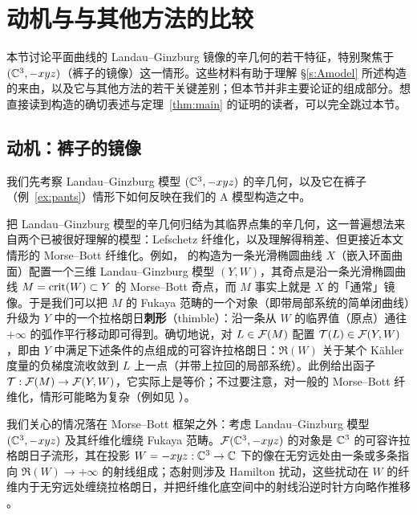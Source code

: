 \section{动机与与其他方法的比较}\label{s:pantsmotivate}

本节讨论平面曲线的 Landau--Ginzburg 镜像的辛几何的若干特征，特别聚焦于 $(\mathbb{C}^3,-xyz)$（裤子的镜像）这一情形。这些材料有助于理解 §\ref{s:Amodel} 所述构造的来由，以及它与其他方法的若干关键差别；但本节并非主要论证的组成部分。想直接读到构造的确切表述与定理~\ref{thm:main} 的证明的读者，可以完全跳过本节。

\subsection{动机：裤子的镜像}\label{ss:pantsmirror}

我们先考察 Landau--Ginzburg 模型 $(\mathbb{C}^3,-xyz)$ 的辛几何，以及它在裤子（例~\ref{ex:pants}）情形下如何反映在我们的 A 模型构造之中。

把 Landau--Ginzburg 模型的辛几何归结为其临界点集的辛几何，这一普遍想法来自两个已被很好理解的模型：Lefschetz 纤维化，以及理解得稍差、但更接近本文情形的 Morse--Bott 纤维化。例如，\cite{AAK} 的构造为一条光滑椭圆曲线 $X$（嵌入环面曲面）配置一个三维 Landau--Ginzburg 模型 $(Y,W)$，其奇点是沿一条光滑椭圆曲线 $M=\operatorname{crit}(W)\subset Y$ 的 Morse--Bott 奇点，而 $M$ 事实上就是 $X$ 的「通常」镜像。于是我们可以把 $M$ 的 Fukaya 范畴的一个对象（即带局部系统的简单闭曲线）升级为 $Y$ 中的一个拉格朗日\textbf{刺形}（thimble）：沿一条从 $W$ 的临界值（原点）通往 $+\infty$ 的弧作平行移动即可得到。确切地说，对 $L\in\mathcal{F}(M)$ 配置 $\mathcal{T}(L)\in\mathcal{F}(Y,W)$，即由 $Y$ 中满足下述条件的点组成的可容许拉格朗日：$\Re(W)$ 关于某个 K\"ahler 度量的负梯度流收敛到 $L$ 上一点（并带上拉回的局部系统）。此例给出函子 $\mathcal{T}:\mathcal{F}(M)\to\mathcal{F}(Y,W)$，它实际上是等价；不过要注意，对一般的 Morse--Bott 纤维化，情形可能略为复杂（例如见 \cite[推论 7.8]{AAK}）。

我们关心的情况落在 Morse--Bott 框架之外：考虑 Landau--Ginzburg 模型 $(\mathbb{C}^3,-xyz)$ 及其纤维化缠绕 Fukaya 范畴。$\mathcal{F}(\mathbb{C}^3,-xyz)$ 的对象是 $\mathbb{C}^3$ 的可容许拉格朗日子流形，其在投影 $W=-xyz:\mathbb{C}^3\to\mathbb{C}$ 下的像在无穷远处由一条或多条指向 $\Re(W)\to+\infty$ 的射线组成；态射则涉及 Hamilton 扰动，这些扰动在 $W$ 的纤维内于无穷远处缠绕拉格朗日，并把纤维化底空间中的射线沿逆时针方向略作推移 \cite{AA}。

